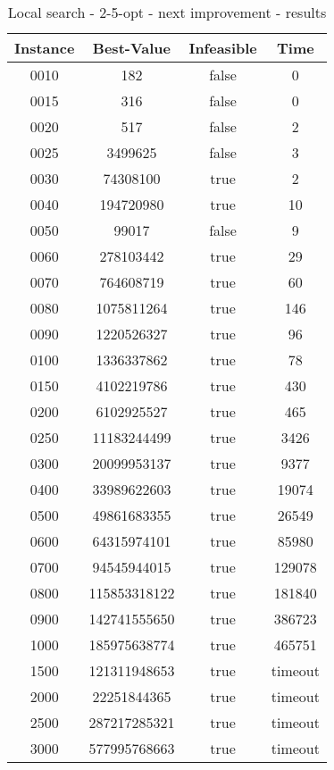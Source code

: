 \begin{table}
\centering
	\begin{tabular}{|| c | c | c | c ||} 
		\hline
		Instance & Best-Value & Infeasible & Time \\
		\hline\hline
0010 & 182 & false & 0 \\
0015 & 316 & false & 0 \\
0020 & 517 & false & 2 \\
0025 & 3499625 & false & 3 \\
0030 & 74308100 & true & 2 \\
0040 & 194720980 & true & 10 \\
0050 & 99017 & false & 9 \\
0060 & 278103442 & true & 29 \\
0070 & 764608719 & true & 60 \\
0080 & 1075811264 & true & 146 \\
0090 & 1220526327 & true & 96 \\
0100 & 1336337862 & true & 78 \\
0150 & 4102219786 & true & 430 \\
0200 & 6102925527 & true & 465 \\
0250 & 11183244499 & true & 3426 \\
0300 & 20099953137 & true & 9377 \\
0400 & 33989622603 & true & 19074 \\
0500 & 49861683355 & true & 26549 \\
0600 & 64315974101 & true & 85980 \\
0700 & 94545944015 & true & 129078 \\
0800 & 115853318122 & true & 181840 \\
0900 & 142741555650 & true & 386723 \\
1000 & 185975638774 & true & 465751 \\
1500 & 121311948653 & true & timeout \\
2000 & 22251844365 & true & timeout \\
2500 & 287217285321 & true & timeout \\
3000 & 577995768663 & true & timeout \\
		\hline
	\end{tabular}
\caption{Local search - 2-5-opt - next improvement - results}
\end{table}

